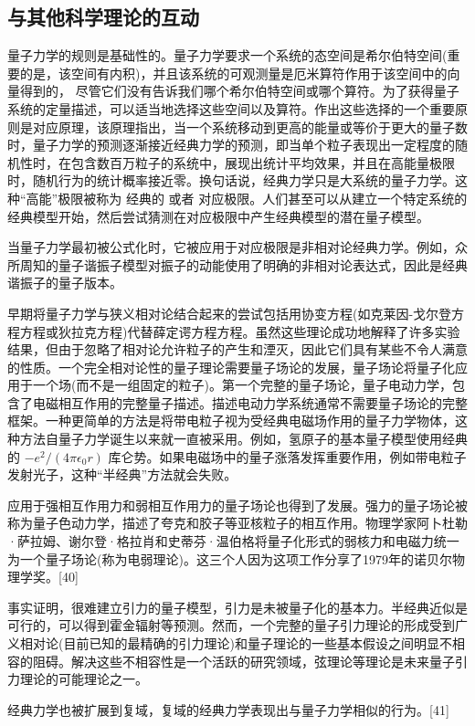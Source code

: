 \subsection{与其他科学理论的互动}
量子力学的规则是基础性的。量子力学要求一个系统的态空间是希尔伯特空间(重要的是，该空间有内积)，并且该系统的可观测量是厄米算符作用于该空间中的向量得到的， 尽管它们没有告诉我们哪个希尔伯特空间或哪个算符。为了获得量子系统的定量描述，可以适当地选择这些空间以及算符。作出这些选择的一个重要原则是对应原理，该原理指出，当一个系统移动到更高的能量或等价于更大的量子数时，量子力学的预测逐渐接近经典力学的预测，即当单个粒子表现出一定程度的随机性时，在包含数百万粒子的系统中，展现出统计平均效果，并且在高能量极限时，随机行为的统计概率接近零。换句话说，经典力学只是大系统的量子力学。这种“高能”极限被称为 经典的 或者 对应极限。人们甚至可以从建立一个特定系统的经典模型开始，然后尝试猜测在对应极限中产生经典模型的潜在量子模型。

当量子力学最初被公式化时，它被应用于对应极限是非相对论经典力学。例如，众所周知的量子谐振子模型对振子的动能使用了明确的非相对论表达式，因此是经典谐振子的量子版本。

早期将量子力学与狭义相对论结合起来的尝试包括用协变方程(如克莱因-戈尔登方程方程或狄拉克方程)代替薛定谔方程方程。虽然这些理论成功地解释了许多实验结果，但由于忽略了相对论允许粒子的产生和湮灭，因此它们具有某些不令人满意的性质。一个完全相对论性的量子理论需要量子场论的发展，量子场论将量子化应用于一个场(而不是一组固定的粒子)。第一个完整的量子场论，量子电动力学，包含了电磁相互作用的完整量子描述。描述电动力学系统通常不需要量子场论的完整框架。一种更简单的方法是将带电粒子视为受经典电磁场作用的量子力学物体，这种方法自量子力学诞生以来就一直被采用。例如，氢原子的基本量子模型使用经典的 $-{e^2}/(4 \pi \epsilon_{0} r)$
  库仑势。如果电磁场中的量子涨落发挥重要作用，例如带电粒子发射光子，这种“半经典”方法就会失败。

应用于强相互作用力和弱相互作用力的量子场论也得到了发展。强力的量子场论被称为量子色动力学，描述了夸克和胶子等亚核粒子的相互作用。物理学家阿卜杜勒·萨拉姆、谢尔登·格拉肖和史蒂芬·温伯格将量子化形式的弱核力和电磁力统一为一个量子场论(称为电弱理论)。这三个人因为这项工作分享了1979年的诺贝尔物理学奖。[40]

事实证明，很难建立引力的量子模型，引力是未被量子化的基本力。半经典近似是可行的，可以得到霍金辐射等预测。然而，一个完整的量子引力理论的形成受到广义相对论(目前已知的最精确的引力理论)和量子理论的一些基本假设之间明显不相容的阻碍。解决这些不相容性是一个活跃的研究领域，弦理论等理论是未来量子引力理论的可能理论之一。

经典力学也被扩展到复域，复域的经典力学表现出与量子力学相似的行为。[41]

